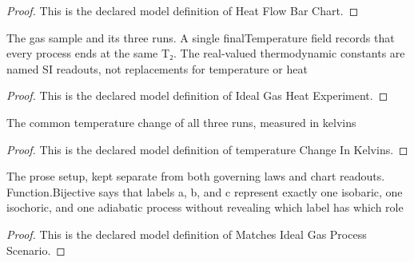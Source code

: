 \begin{proof}
  This is the declared model definition of Heat Flow Bar Chart.
\end{proof}
\begin{definition}
  \label{def:physics:phyx-mini-0346:phyxminiproblems-problemphyxmini0346-idealgasheatexperiment}
  The gas sample and its three runs. A single finalTemperature field records that every process ends at the same T₂. The real-valued thermodynamic constants are named SI readouts, not replacements for temperature or heat
\end{definition}
\begin{proof}
  This is the declared model definition of Ideal Gas Heat Experiment.
\end{proof}
\begin{definition}
  \label{def:physics:phyx-mini-0346:phyxminiproblems-problemphyxmini0346-temperaturechangeinkelvins}
  The common temperature change of all three runs, measured in kelvins
\end{definition}
\begin{proof}
  This is the declared model definition of temperature Change In Kelvins.
\end{proof}
\begin{definition}
  \label{def:physics:phyx-mini-0346:phyxminiproblems-problemphyxmini0346-matchesidealgasprocessscenario}
  The prose setup, kept separate from both governing laws and chart readouts. Function.Bijective says that labels a, b, and c represent exactly one isobaric, one isochoric, and one adiabatic process without revealing which label has which role
\end{definition}
\begin{proof}
  This is the declared model definition of Matches Ideal Gas Process Scenario.
\end{proof}
